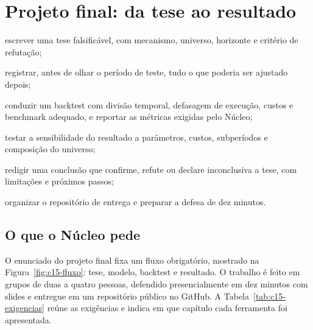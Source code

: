 \chapter{Projeto final: da tese ao resultado}
\label{cap:projeto}


\begin{objetivos}
  \item escrever uma tese falsificável, com mecanismo, universo, horizonte e critério de refutação;
  \item registrar, antes de olhar o período de teste, tudo o que poderia ser ajustado depois;
  \item conduzir um backtest com divisão temporal, defasagem de execução, custos e benchmark adequado, e reportar as métricas exigidas pelo Núcleo;
  \item testar a sensibilidade do resultado a parâmetros, custos, subperíodos e composição do universo;
  \item redigir uma conclusão que confirme, refute ou declare inconclusiva a tese, com limitações e próximos passos;
  \item organizar o repositório de entrega e preparar a defesa de dez minutos.
\end{objetivos}

\section{O que o Núcleo pede}

O enunciado do projeto final fixa um fluxo obrigatório, mostrado na Figura~\ref{fig:c15-fluxo}: tese, modelo, backtest e resultado. O trabalho é feito em grupos de duas a quatro pessoas, defendido presencialmente em dez minutos com slides e entregue em um repositório público no GitHub. A Tabela~\ref{tab:c15-exigencias} reúne as exigências e indica em que capítulo cada ferramenta foi apresentada.

